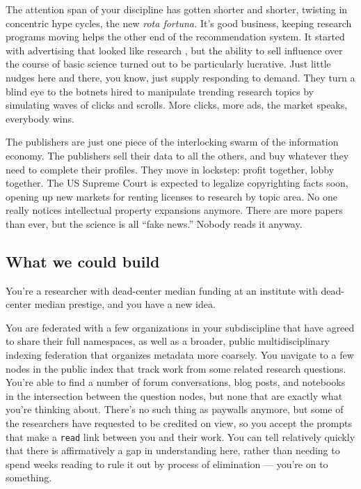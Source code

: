 The attention span of your discipline has gotten shorter and shorter,
twisting in concentric hype cycles, the new \emph{rota fortuna.} It's
good business, keeping research programs moving helps the other end of
the recommendation system. It started with advertising that looked like
research \citep{elsevier360AdvertisingSolutions} , but the ability
to sell influence over the course of basic science turned out to be
particularly lucrative. Just little nudges here and there, you know,
just supply responding to demand. They turn a blind eye to the botnets
hired to manipulate trending research topics by simulating waves of
clicks and scrolls. More clicks, more ads, the market speaks, everybody
wins.

The publishers are just one piece of the interlocking swarm of the
information economy. The publishers sell their data to all the others,
and buy whatever they need to complete their profiles. They move in
lockstep: profit together, lobby together. The US Supreme Court is
expected to legalize copyrighting facts soon, opening up new markets for
renting licenses to research by topic area. No one really notices
intellectual property expansions anymore. There are more papers than
ever, but the science is all ``fake news.'' Nobody reads it anyway.

\hypertarget{what-we-could-build}{%
\subsection{What we could build}\label{what-we-could-build}}

You're a researcher with dead-center median funding at an institute with
dead-center median prestige, and you have a new idea.

You are federated with a few organizations in your subdiscipline that
have agreed to share their full namespaces, as well as a broader, public
multidisciplinary indexing federation that organizes metadata more
coarsely. You navigate to a few nodes in the public index that track
work from some related research questions. You're able to find a number
of forum conversations, blog posts, and notebooks in the intersection
between the question nodes, but none that are exactly what you're
thinking about. There's no such thing as paywalls anymore, but some of
the researchers have requested to be credited on view, so you accept the
prompts that make a \texttt{read} link between you and their work. You
can tell relatively quickly that there is affirmatively a gap in
understanding here, rather than needing to spend weeks reading to rule
it out by process of elimination --- you're on to something.


